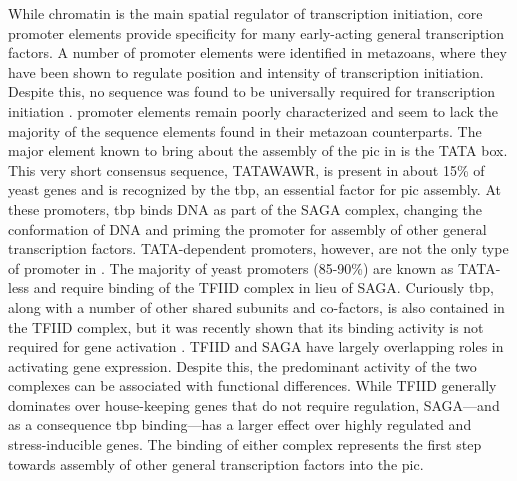 While chromatin is the main spatial regulator of transcription initiation, core promoter elements provide specificity for many early-acting general transcription factors. 
A number of promoter elements were identified in metazoans, where they have been shown to regulate position and intensity of transcription initiation.
Despite this, no sequence was found to be universally required for transcription initiation \cite{butler:2002:RNA}.
\cer promoter elements remain poorly characterized and seem to lack the majority of the sequence elements found in their metazoan counterparts. 
The major element known to bring about the assembly of the \gls{pic} in \cer is the TATA box.
This very short consensus sequence, TATAWAWR, is present in about 15\% of yeast genes \cite{kamenova:2014:mutations} and is recognized by the \gls{tbp}, an essential factor for \gls{pic} assembly. 
At these promoters, \gls{tbp} binds DNA as part of the SAGA complex, changing the conformation of DNA and priming the promoter for assembly of other general transcription factors. 
TATA-dependent promoters, however, are not the only type of promoter in \cer. 
The majority of yeast promoters (85-90\%)  are known as TATA-less and require binding of the TFIID complex in lieu of SAGA. 
Curiously \gls{tbp}, along with a number of other shared subunits and co-factors, is also contained in the TFIID complex, but it was recently shown that its binding activity is not required for gene activation \cite{kamenova:2014:mutations}.
TFIID and SAGA have largely overlapping roles in activating gene expression.
Despite this, the predominant activity of the two complexes can be associated with functional differences.
While TFIID generally dominates over house-keeping genes that do not require regulation, SAGA---and as a consequence \gls{tbp} binding---has a larger effect over highly regulated and stress-inducible genes.
The binding of either complex represents the first step towards assembly of other general transcription factors into the \gls{pic}.

